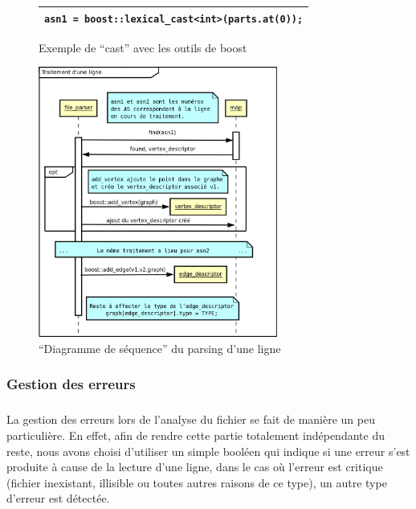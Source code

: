 \begin{figure}[H]
   \begin{center}
      \begin{tabular}{l}
        \hline 
 	\verb|asn1 = boost::lexical_cast<int>(parts.at(0));|\\
        \hline
      \end{tabular}
   \end{center}
\caption{\label{cast_boost} Exemple de ``cast'' avec les outils de boost}
\end{figure}

\begin{figure}[H]
\begin{center}
        \includegraphics[width=0.7\textwidth]{./schema/file_parser2.png}
\caption{``Diagramme de séquence'' du parsing d'une ligne }
\label{file_parser}
\end{center}
\end{figure}

\subsubsection{Gestion des erreurs}
\subparagraph{}
La gestion des erreurs lors de l'analyse du fichier se fait de manière un peu particulière. En effet, afin de rendre cette partie totalement indépendante du reste, nous avons choisi d'utiliser un simple booléen qui indique si une erreur s'est produite à cause de la lecture d'une ligne, dans le cas où l'erreur est critique (fichier inexistant, illisible ou toutes autres raisons de ce type), un autre type d'erreur est détectée. 

